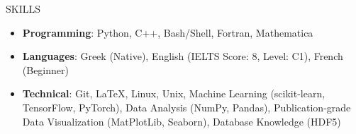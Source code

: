 \documentclass{resume} %
\begin{document}

        
        \vspace{-0.5em}

        \begin{rSection}{SKILLS}
                \begin{itemize}
                        \itemsep -2pt {} 
                        \item \textbf{Programming}: Python, C++, Bash/Shell, Fortran, Mathematica
                        \item \textbf{Languages}: Greek (Native), English (IELTS Score: 8, Level: C1), French (Beginner)
                        \item \textbf{Technical}: Git, \LaTeX, Linux, Unix, Machine Learning (scikit-learn, TensorFlow, PyTorch), Data Analysis (NumPy, Pandas), Publication-grade Data Visualization (MatPlotLib, Seaborn), Database Knowledge (HDF5)
                \end{itemize}
        \end{rSection}

        \bigbreak


        \bigbreak

\end{document}
